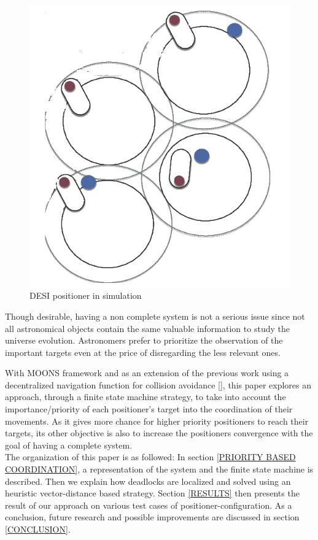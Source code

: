 \documentclass[]{spie}  %
\begin{document}
\begin{figure}[H]
\begin{minipage}[t]{5cm}
			\includegraphics[scale=0.3]{images/DESI_Positioner.png}
			\caption{DESI positioner in simulation}
			\label{DESI_positioner_representation}
		\end{minipage}
	\end{figure}
			
	Though desirable, having a non complete system is not a serious issue since not all astronomical objects contain the same valuable information to study the universe evolution. Astronomers prefer to prioritize the observation of the important targets even at the price of disregarding the less relevant ones.
	
	With MOONS framework and as an extension of the previous work using a decentralized navigation function for collision avoidance [], this paper explores an approach, through a finite state machine strategy, to take into account the importance/priority of each positioner's target into the coordination of their movements. As it gives more chance for higher priority positioners to reach their targets, its other objective is also to increase the positioners convergence with the goal of having a complete system.\\
		
	The organization of this paper is as followed: In section \ref{PRIORITY BASED COORDINATION}, a representation of the system and the finite state machine is described. Then we explain how deadlocks are localized and solved using an heuristic vector-distance based strategy. Section \ref{RESULTS} then presents the result of our approach on various test cases of positioner-configuration. As a conclusion, future research and possible improvements are discussed in section \ref{CONCLUSION}.
	
\end{document}
